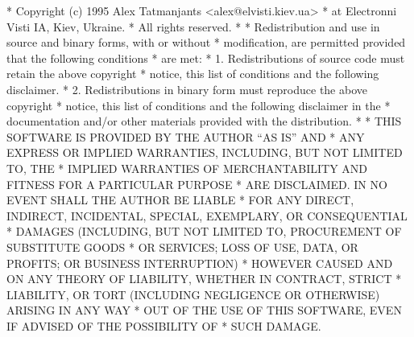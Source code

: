 \begin{copyrightEnv}
 * Copyright (c) 1995 Alex Tatmanjants <alex@elvisti.kiev.ua>
 *              at Electronni Visti IA, Kiev, Ukraine.
 *                      All rights reserved.
 *
 * Redistribution and use in source and binary forms, with or without
 * modification, are permitted provided that the following conditions
 * are met:
 * 1. Redistributions of source code must retain the above copyright
 *    notice, this list of conditions and the following disclaimer.
 * 2. Redistributions in binary form must reproduce the above copyright
 *    notice, this list of conditions and the following disclaimer in the
 *    documentation and/or other materials provided with the distribution.
 *
 * THIS SOFTWARE IS PROVIDED BY THE AUTHOR ``AS IS'' AND
 * ANY EXPRESS OR IMPLIED WARRANTIES, INCLUDING, BUT NOT LIMITED TO, THE
 * IMPLIED WARRANTIES OF MERCHANTABILITY AND FITNESS FOR A PARTICULAR PURPOSE
 * ARE DISCLAIMED.  IN NO EVENT SHALL THE AUTHOR BE LIABLE
 * FOR ANY DIRECT, INDIRECT, INCIDENTAL, SPECIAL, EXEMPLARY, OR CONSEQUENTIAL
 * DAMAGES (INCLUDING, BUT NOT LIMITED TO, PROCUREMENT OF SUBSTITUTE GOODS
 * OR SERVICES; LOSS OF USE, DATA, OR PROFITS; OR BUSINESS INTERRUPTION)
 * HOWEVER CAUSED AND ON ANY THEORY OF LIABILITY, WHETHER IN CONTRACT, STRICT
 * LIABILITY, OR TORT (INCLUDING NEGLIGENCE OR OTHERWISE) ARISING IN ANY WAY
 * OUT OF THE USE OF THIS SOFTWARE, EVEN IF ADVISED OF THE POSSIBILITY OF
 * SUCH DAMAGE.
\end{copyrightEnv}

